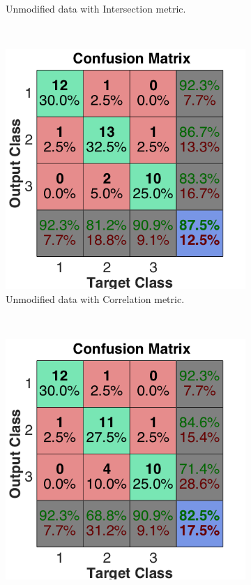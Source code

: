 \documentclass[a4paper, 10pt, conference]{ieeeconf}
\begin{document}
\begin{figure}[!ht]
\begin{subfigure}{0.32\textwidth}
      \caption{Unmodified data with Intersection metric.}
    \end{subfigure}
    ~
    \begin{subfigure}{0.32\textwidth}
      \includegraphics[width=\textwidth]{pic/unmod_corr.png}
      \caption{Unmodified data with Correlation metric.}
    \end{subfigure}
    ~
    \begin{subfigure}{0.32\textwidth}
      \includegraphics[width=\textwidth]{pic/unmod_cov_l2.png}

\end{subfigure}
\end{figure}
\end{document}
